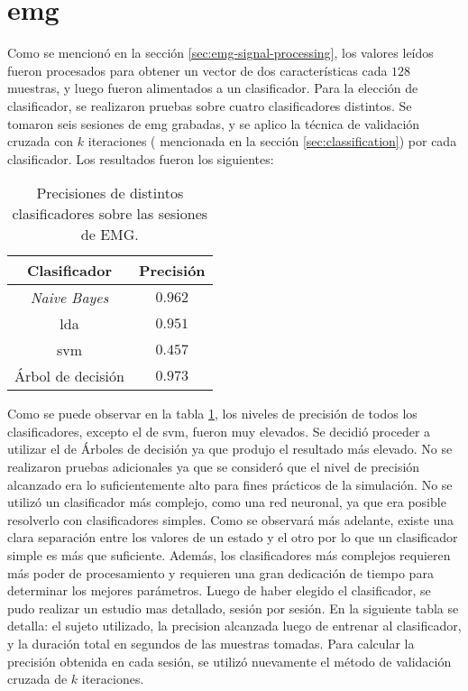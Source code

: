 \section{\acrshort{emg}} \label{sec:emg-results}

Como se mencionó en la sección \ref{sec:emg-signal-processing}, los valores leídos fueron procesados para obtener un vector de dos características cada $128$ muestras, y luego fueron alimentados a un clasificador. Para la elección de clasificador, se realizaron pruebas sobre cuatro clasificadores distintos. Se tomaron seis sesiones de \acrshort{emg} grabadas, y se aplico la técnica de validación cruzada con $k$ iteraciones ( mencionada en la sección \ref{sec:classification}) por cada clasificador. Los resultados fueron los siguientes:

\begin{table}[H]
\centering
\begin{tabular}{ |c|c| }
 \hline
 Clasificador & Precisión \\ 
 \hline
 \emph{Naive Bayes} & $0.962$ \\
 \hline
 \gls{lda} & $0.951$ \\
 \hline
  \gls{svm} & $0.457$ \\
 \hline
 Árbol de decisión & $0.973$ \\
 
 \hline
\end{tabular}
\caption{Precisiones de distintos clasificadores sobre las sesiones de EMG.}
\label{tab:emg-classifiers}
\end{table}

Como se puede observar en la tabla \ref{tab:emg-classifiers}, los niveles de precisión de todos los clasificadores, excepto el de \acrshort{svm}, fueron muy elevados. Se decidió proceder a utilizar el de Árboles de decisión ya que produjo el resultado más elevado. No se realizaron pruebas adicionales ya que se consideró que el nivel de precisión alcanzado era lo suficientemente alto para fines prácticos de la simulación. No se utilizó un clasificador más complejo, como una red neuronal, ya que era posible resolverlo con clasificadores simples. Como se observará más adelante, existe una clara separación entre los valores de un estado y el otro por lo que un clasificador simple es más que suficiente. Además, los clasificadores más complejos requieren más poder de procesamiento y requieren una gran dedicación de tiempo para determinar los mejores parámetros. Luego de haber elegido el clasificador, se pudo realizar un estudio mas detallado, sesión por sesión. En la siguiente tabla se detalla: el sujeto utilizado, la precision alcanzada luego de entrenar al clasificador, y la duración total en segundos de las muestras tomadas. Para calcular la precisión obtenida en cada sesión, se utilizó nuevamente el método de validación cruzada de $k$ iteraciones.

